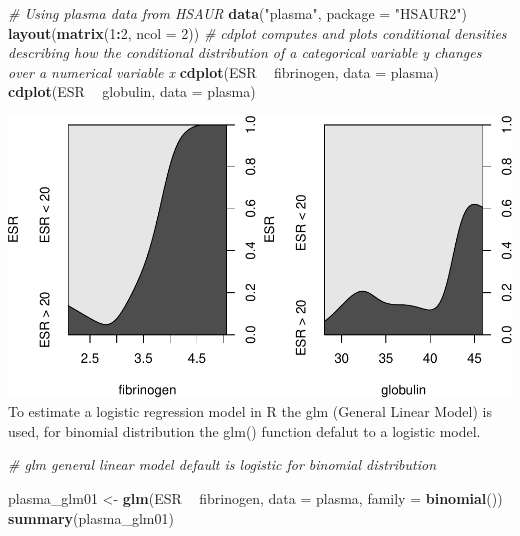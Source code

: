 \documentclass[
]{article}
\newenvironment{Shaded}{\begin{snugshade}}{\end{snugshade}}
\newcommand{\CommentTok}[1]{\textcolor[rgb]{0.56,0.35,0.01}{\textit{#1}}}
\newcommand{\DataTypeTok}[1]{\textcolor[rgb]{0.13,0.29,0.53}{#1}}
\newcommand{\DecValTok}[1]{\textcolor[rgb]{0.00,0.00,0.81}{#1}}
\newcommand{\KeywordTok}[1]{\textcolor[rgb]{0.13,0.29,0.53}{\textbf{#1}}}
\newcommand{\NormalTok}[1]{#1}
\newcommand{\OperatorTok}[1]{\textcolor[rgb]{0.81,0.36,0.00}{\textbf{#1}}}
\newcommand{\StringTok}[1]{\textcolor[rgb]{0.31,0.60,0.02}{#1}}
\begin{document}
\begin{Shaded}
\begin{Highlighting}[]
\CommentTok{# Using plasma data from HSAUR}
\KeywordTok{data}\NormalTok{(}\StringTok{"plasma"}\NormalTok{, }\DataTypeTok{package =} \StringTok{"HSAUR2"}\NormalTok{)}
\KeywordTok{layout}\NormalTok{(}\KeywordTok{matrix}\NormalTok{(}\DecValTok{1}\OperatorTok{:}\DecValTok{2}\NormalTok{, }\DataTypeTok{ncol =} \DecValTok{2}\NormalTok{))}
\CommentTok{# cdplot computes and plots conditional densities describing how the conditional distribution of a categorical variable y changes over a numerical variable x}
\KeywordTok{cdplot}\NormalTok{(ESR }\OperatorTok{~}\StringTok{ }\NormalTok{fibrinogen, }\DataTypeTok{data =}\NormalTok{ plasma)}
\KeywordTok{cdplot}\NormalTok{(ESR }\OperatorTok{~}\StringTok{ }\NormalTok{globulin, }\DataTypeTok{data =}\NormalTok{ plasma)}
\end{Highlighting}
\end{Shaded}

\includegraphics{LogisticRegressionCh5_files/figure-latex/unnamed-chunk-2-1.pdf}
To estimate a logistic regression model in R the glm (General Linear
Model) is used, for binomial distribution the glm() function defalut to
a logistic model.

\begin{Shaded}
\begin{Highlighting}[]
\CommentTok{# glm general linear model default is logistic for binomial distribution}

\NormalTok{plasma_glm01 <-}\StringTok{ }\KeywordTok{glm}\NormalTok{(ESR }\OperatorTok{~}\StringTok{ }\NormalTok{fibrinogen, }\DataTypeTok{data =}\NormalTok{ plasma, }\DataTypeTok{family =} \KeywordTok{binomial}\NormalTok{())}
\KeywordTok{summary}\NormalTok{(plasma_glm01)}
\end{Highlighting}
\end{Shaded}
\end{document}
